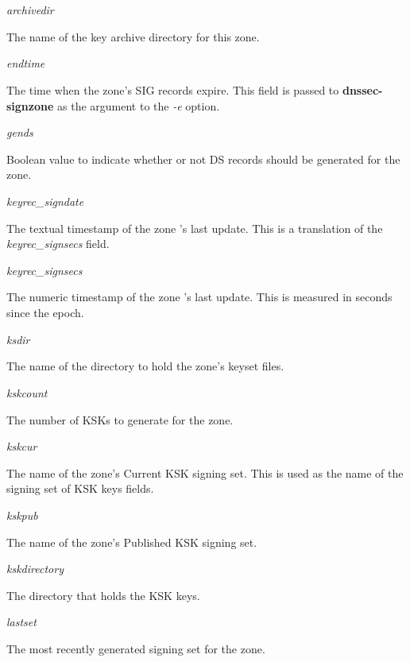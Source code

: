 \begin{description}

\item {\it archivedir}\verb" "

The name of the key archive directory for this zone.

\item {\it endtime}\verb" "

The time when the zone's SIG records expire.  This field is passed to
{\bf dnssec-signzone} as the argument to the {\it -e} option.

\item {\it gends}\verb" "

Boolean value to indicate whether or not DS records should be generated for
the zone.

\item {\it keyrec\_signdate}\verb" "

The textual timestamp of the zone 's last update.
This is a translation of the {\it keyrec\_signsecs} field.

\item {\it keyrec\_signsecs}\verb" "

The numeric timestamp of the zone 's last update.
This is measured in seconds since the epoch.

\item {\it ksdir}\verb" "

The name of the directory to hold the zone's keyset files.

\item {\it kskcount}\verb" "

The number of KSKs to generate for the zone.

\item {\it kskcur}\verb" "

The name of the zone's Current KSK signing set.
This is used as the name of the signing set of KSK keys  fields.

\item {\it kskpub}\verb" "

The name of the zone's Published KSK signing set.

\item {\it kskdirectory}\verb" "

The directory that holds the KSK keys.

\item {\it lastset}\verb" "

The most recently generated signing set for the zone.


\end{description}
